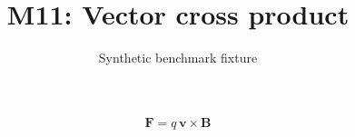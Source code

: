 \documentclass{article}
\title{M11: Vector cross product}
\author{Synthetic benchmark fixture}
\date{}
\begin{document}
\maketitle
\[\mathbf{F}=q\,\mathbf{v}\times\mathbf{B}\]
\end{document}
